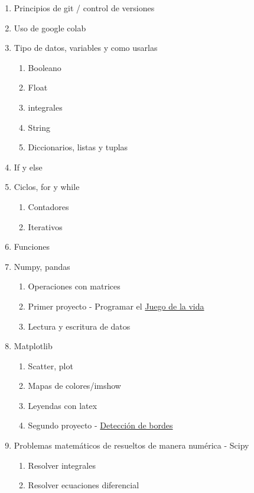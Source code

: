 \documentclass[12pt,letterpaper]{article}
\begin{document}
\begin{enumerate}
    \item Principios de git / control de versiones
    \item Uso de google colab
    \item Tipo de datos, variables y como usarlas
    \begin{enumerate}
        \item Booleano
        \item Float
        \item integrales
        \item String
        \item Diccionarios, listas y tuplas
    \end{enumerate}
    \item If y else
    \item Ciclos, for y while
    \begin{enumerate}
        \item Contadores
        \item Iterativos
    \end{enumerate}
    \item Funciones
    \item Numpy, pandas
    \begin{enumerate}
        \item Operaciones con matrices
        \item Primer proyecto - Programar el \href{https://en.wikipedia.org/wiki/Conway%27s_Game_of_Life}{Juego de la vida}
        \item Lectura y escritura de datos
    \end{enumerate}
    \item Matplotlib
    \begin{enumerate}
        \item Scatter, plot
        \item Mapas de colores/imshow
        \item Leyendas con latex
        \item Segundo proyecto - \href{https://en.wikipedia.org/wiki/Edge_detection}{Detección de bordes}
    \end{enumerate}
    \item Problemas matemáticos de resueltos de manera numérica - Scipy
    \begin{enumerate}
        \item Resolver integrales
        \item Resolver ecuaciones diferencial

\end{enumerate}
\end{enumerate}
\end{document}
